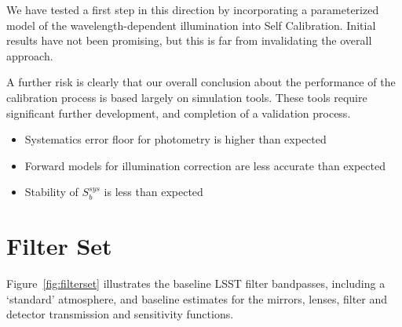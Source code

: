 \documentclass[12pt,preprint]{aastex}
\begin{document}
We have tested a first step in this direction by incorporating
a parameterized model of the wavelength-dependent illumination into Self Calibration.  Initial 
results have not been promising, but this is far from invalidating the overall approach.

A further risk is clearly that our overall conclusion about the performance of the calibration process is based largely on
simulation tools.  These tools require significant further development, and completion of a validation process.

\begin{itemize}
\item Systematics error floor for photometry is higher than expected
\item Forward models for illumination correction are less accurate than expected
\item Stability of $S_b^{sys}$ is less than expected
\end{itemize}





\appendix

\newpage
\section{Filter Set}

Figure~\ref{fig:filterset} illustrates the baseline LSST filter
bandpasses, including a `standard' atmosphere, and baseline estimates
for the mirrors, lenses, filter and detector transmission and
sensitivity functions. 
\end{document}
